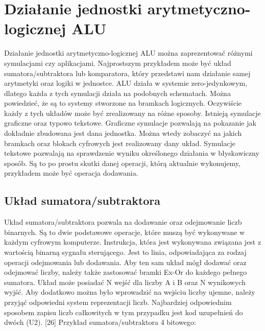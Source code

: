 \documentclass[12pt, a4paper, onside, polish]{article}				%
\begin{document}
\cleardoublepage





\section{Działanie jednostki arytmetyczno-logicznej ALU}
\hspace{\parindent}
Działanie jednostki arytmetyczno-logicznej ALU można zaprezentować różnymi symulacjami czy aplikacjami. Najprostszym przykładem może być układ sumatora/subtraktora lub komparatora, który przedstawi nam działanie samej arytmetyki oraz logiki w jednostce. ALU działa w systemie zero-jedynkowym, dlatego każda z tych symulacji działa na podobnych schematach. Można powiedzieć, że są to systemy stworzone na bramkach logicznych. Oczywiście każdy z tych układów może być zrealizowany na różne sposoby. Istnieją symulacje graficzne oraz typowo tekstowe. 
	 Graficzne symulacje pozwalają na pokazanie jak dokładnie zbudowana jest dana jednostka. Można wtedy zobaczyć na jakich bramkach oraz blokach cyfrowych jest realizowany dany układ.  
	Symulacje tekstowe pozwalają na sprawdzenie wyniku określonego działania w błyskawiczny sposób. Są to po prostu skutki danej operacji, którą aktualnie wykonujemy, przykładem może być operacja dodawania.  
	

\subsection{Układ sumatora/subtraktora}
\hspace{\parindent}
Układ sumatora/subtraktora pozwala na dodawanie oraz odejmowanie liczb binarnych. Są to dwie podstawowe operacje, które muszą być wykonywane w każdym cyfrowym komputerze. Instrukcja, która jest wykonywana związana jest z wartością binarną sygnału sterującego. Jest to linia, odpowiadająca za rodzaj operacji odejmowania lub dodawania. Aby ten sam układ mógł dodawać oraz odejmować liczby, należy także zastosować bramki Ex-Or do każdego pełnego sumatora. Układ może posiadać N wejść dla liczby A i B oraz N wynikowych wyjść. Aby dodatkowo można było wprowadzić na wejściu liczby ujemne, należy przyjąć odpowiedni system reprezentacji liczb. Najbardziej odpowiednim sposobem zapisu liczb całkowitych w tym przypadku jest kod uzupełnień do dwóch (U2). [26]
\cleardoublepage
Przykład sumatora/subtraktora 4 bitowego:
\end{document}
